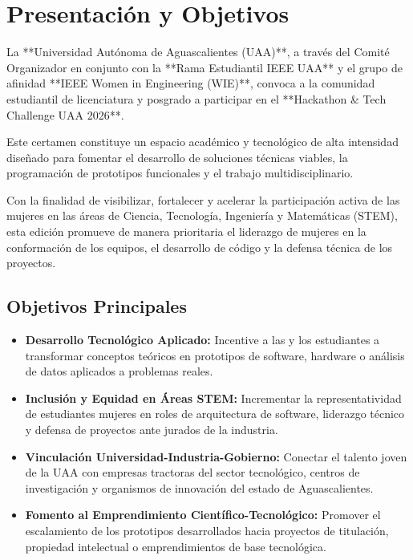 \documentclass[11pt,letterpaper]{article}
\begin{document}
\tableofcontents


\section{Presentación y Objetivos}

La **Universidad Autónoma de Aguascalientes (UAA)**, a través del Comité Organizador en conjunto con la **Rama Estudiantil IEEE UAA** y el grupo de afinidad **IEEE Women in Engineering (WIE)**, convoca a la comunidad estudiantil de licenciatura y posgrado a participar en el **Hackathon \& Tech Challenge UAA 2026**.

Este certamen constituye un espacio académico y tecnológico de alta intensidad diseñado para fomentar el desarrollo de soluciones técnicas viables, la programación de prototipos funcionales y el trabajo multidisciplinario.

\begin{stembox}
Con la finalidad de visibilizar, fortalecer y acelerar la participación activa de las mujeres en las áreas de Ciencia, Tecnología, Ingeniería y Matemáticas (STEM), esta edición promueve de manera prioritaria el liderazgo de mujeres en la conformación de los equipos, el desarrollo de código y la defensa técnica de los proyectos.
\end{stembox}

\subsection{Objetivos Principales}
\begin{itemize}
    \item \textbf{Desarrollo Tecnológico Aplicado:} Incentive a las y los estudiantes a transformar conceptos teóricos en prototipos de software, hardware o análisis de datos aplicados a problemas reales.
    \item \textbf{Inclusión y Equidad en Áreas STEM:} Incrementar la representatividad de estudiantes mujeres en roles de arquitectura de software, liderazgo técnico y defensa de proyectos ante jurados de la industria.
    \item \textbf{Vinculación Universidad-Industria-Gobierno:} Conectar el talento joven de la UAA con empresas tractoras del sector tecnológico, centros de investigación y organismos de innovación del estado de Aguascalientes.
    \item \textbf{Fomento al Emprendimiento Científico-Tecnológico:} Promover el escalamiento de los prototipos desarrollados hacia proyectos de titulación, propiedad intelectual o emprendimientos de base tecnológica.
\end{itemize}
\end{document}

